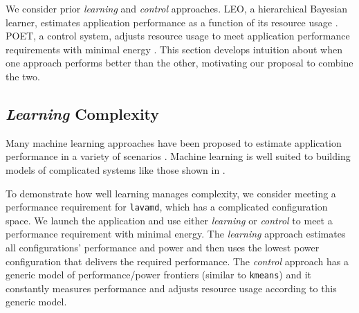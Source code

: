 
We consider prior \emph{learning} and \emph{control} approaches.  LEO,
a hierarchical Bayesian learner, estimates application performance as
a function of its resource usage \cite{LEO}. POET, a control system,
adjusts resource usage to meet application performance requirements
with minimal energy \cite{POET}.  This section develops intuition
about when one approach performs better than the other, motivating our
proposal to combine the two.

\subsection{\emph{Learning} Complexity}
Many machine learning approaches have been proposed to estimate
application performance in a variety of scenarios
\cite{reddiHPCA2013,LeeBrooks2006,CPR,ParallelismDial,Flicker,LeeBrooks,Koala}.
Machine learning is well suited to building models of complicated
systems like those shown in
.

To demonstrate how well learning manages complexity, we consider
meeting a performance requirement for \texttt{lavamd}, which has a
complicated configuration space.  We launch the application and use
either \emph{learning} or \emph{control} to meet a performance
requirement with minimal energy.  The \emph{learning} approach
estimates all configurations' performance and power and then uses the
lowest power configuration that delivers the required performance.
The \emph{control} approach has a generic model of performance/power
frontiers (similar to \texttt{kmeans}) and it constantly measures
performance and adjusts resource usage according to this generic
model.  

